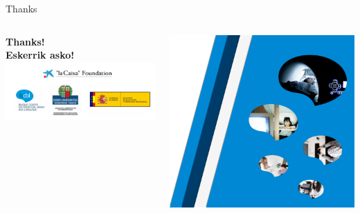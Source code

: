 \documentclass[aspectratio=169]{beamer}
\begin{document}
\begin{frame}{Thanks}
	\begin{columns}
		\begin{center}
			\textbf{Thanks!}\\
			\textbf{Eskerrik asko!} 
			\includegraphics[width=\textwidth]{images/logos_thanks} 	
		\end{center}
		\begin{flushright}
			\includegraphics[width=.75\textwidth]{images/side_thanks}
		\end{flushright}
	\end{columns}
\end{frame}



\end{document}
